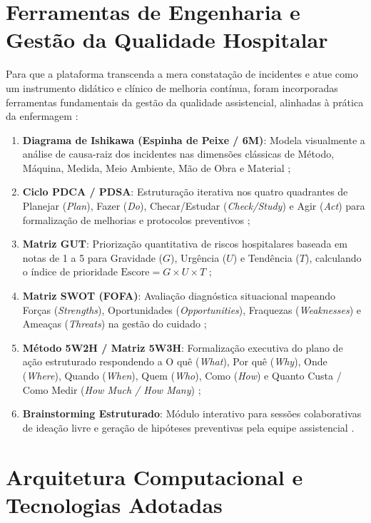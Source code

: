\section{Ferramentas de Engenharia e Gestão da Qualidade Hospitalar}
\label{sec:ferramentas-qualidade}

Para que a plataforma transcenda a mera constatação de incidentes e atue como um instrumento didático e clínico de melhoria contínua, foram incorporadas ferramentas fundamentais da gestão da qualidade assistencial, alinhadas à prática da enfermagem \cite{sze2019, rodrigues2020}:

\begin{enumerate}
    \item \textbf{Diagrama de Ishikawa (Espinha de Peixe / 6M)}: Modela visualmente a análise de causa-raiz dos incidentes nas dimensões clássicas de Método, Máquina, Medida, Meio Ambiente, Mão de Obra e Material \cite{sze2019, rodrigues2020};
    \item \textbf{Ciclo PDCA / PDSA}: Estruturação iterativa nos quatro quadrantes de Planejar (\textit{Plan}), Fazer (\textit{Do}), Checar/Estudar (\textit{Check/Study}) e Agir (\textit{Act}) para formalização de melhorias e protocolos preventivos \cite{sze2019, rodrigues2020};
    \item \textbf{Matriz GUT}: Priorização quantitativa de riscos hospitalares baseada em notas de 1 a 5 para Gravidade ($G$), Urgência ($U$) e Tendência ($T$), calculando o índice de prioridade $\text{Escore} = G \times U \times T$ \cite{sze2019};
    \item \textbf{Matriz SWOT (FOFA)}: Avaliação diagnóstica situacional mapeando Forças (\textit{Strengths}), Oportunidades (\textit{Opportunities}), Fraquezas (\textit{Weaknesses}) e Ameaças (\textit{Threats}) na gestão do cuidado \cite{sze2019};
    \item \textbf{Método 5W2H / Matriz 5W3H}: Formalização executiva do plano de ação estruturado respondendo a O quê (\textit{What}), Por quê (\textit{Why}), Onde (\textit{Where}), Quando (\textit{When}), Quem (\textit{Who}), Como (\textit{How}) e Quanto Custa / Como Medir (\textit{How Much / How Many}) \cite{sze2019};
    \item \textbf{Brainstorming Estruturado}: Módulo interativo para sessões colaborativas de ideação livre e geração de hipóteses preventivas pela equipe assistencial \cite{sze2019, rodrigues2020}.
\end{enumerate}

\section{Arquitetura Computacional e Tecnologias Adotadas}
\label{sec:arquitetura-software}

